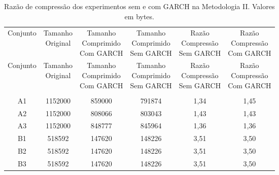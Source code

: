 \begin{center}
\begin{longtable}{cccccc}
\toprule
\rowcolor{white}
\caption[Metodologia II: Razão de compressão]{Razão de compressão dos
experimentos sem e com GARCH na Metodologia II.
Valores em bytes.} \label{Tab:razaocompressaoMet1} \\
\midrule
Conjunto & \specialcell{Tamanho \\Original} & \specialcell{Tamanho
\\Comprimido\\Com GARCH} & \specialcell{Tamanho
\\Comprimido\\Sem GARCH} & \specialcell{Razão \\Compressão
\\Sem GARCH} & \specialcell{Razão \\Compressão
\\Com GARCH} \\
\midrule
\endfirsthead
\midrule
\rowcolor{white}
Conjunto & \specialcell{Tamanho \\Original} & \specialcell{Tamanho
\\Comprimido\\Com GARCH} & \specialcell{Tamanho
\\Comprimido\\Sem GARCH} & \specialcell{Razão \\Compressão
\\Sem GARCH} & \specialcell{Razão \\Compressão
\\Com GARCH} \\
\toprule
\endhead
\midrule \\ %
\endfoot
\bottomrule
\endlastfoot
    A1    & 1152000 & 859000 & 791874 & 1,34  & 1,45 \\
    A2    & 1152000 & 808066 & 803043 & 1,43  & 1,43 \\
    A3    & 1152000 & 848777 & 845964 & 1,36  & 1,36 \\
    B1    & 518592 & 147620 & 148226 & 3,51  & 3,50 \\
    B2    & 518592 & 147620 & 148226 & 3,51  & 3,50 \\
    B3    & 518592 & 147620 & 148226 & 3,51  & 3,50 \\

\end{longtable}
\end{center}
